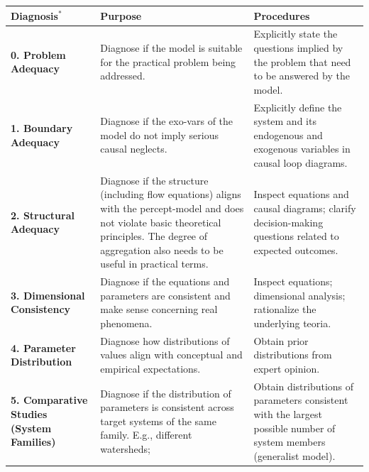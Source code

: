 \documentclass[./main_en.tex]{subfiles}
\begin{document}
{\renewcommand{\arraystretch}{1.5}%
\begin{table}[t!]
    \centering	
    \tiny
    \sffamily
    \begin{tabular}{ 
 >{\raggedright\arraybackslash}m{2.75cm}  
 >{\raggedright\arraybackslash}m{5cm}  
 >{\raggedright\arraybackslash}m{5cm}}
        \toprule
        \textbf{Diagnosis}$^*$& \textbf{Purpose}& \textbf{Procedures}\\ 
        \midrule

        \textbf{0. Problem Adequacy} & Diagnose if the model is suitable for the practical problem being addressed. & Explicitly state the questions implied by the problem that need to be answered by the model.\\
        
        \textbf{1. Boundary Adequacy} & Diagnose if the \gls{exo-vars} of the \gls{model} do not imply serious causal neglects. & Explicitly define the \gls{system} and its endogenous and exogenous variables in causal loop diagrams.\\         
        
        \textbf{2. Structural Adequacy} & Diagnose if the structure (including flow equations) aligns with the \gls{percept-model} and does not violate basic theoretical principles. The degree of aggregation also needs to be useful in practical terms.& 
        Inspect equations and causal diagrams; clarify decision-making questions related to expected outcomes.\\        
        
        \textbf{3. Dimensional Consistency} & Diagnose if the equations and \gls{parameters} are consistent and make sense concerning real phenomena.& 
        Inspect equations; dimensional analysis; rationalize the underlying \gls{teoria}.\\ 
        
        \textbf{4. Parameter Distribution} & Diagnose how distributions of values align with conceptual and empirical expectations.& Obtain prior distributions from expert opinion.\\        
        
        \textbf{5. Comparative Studies (System Families)} & Diagnose if the distribution of \gls{parameters} is consistent across target systems of the same family. E.g., different watersheds;& Obtain distributions of \gls{parameters} consistent with the largest possible number of system members (generalist \gls{model}).\\        
        

\end{tabular}
\end{table}}
\end{document}
